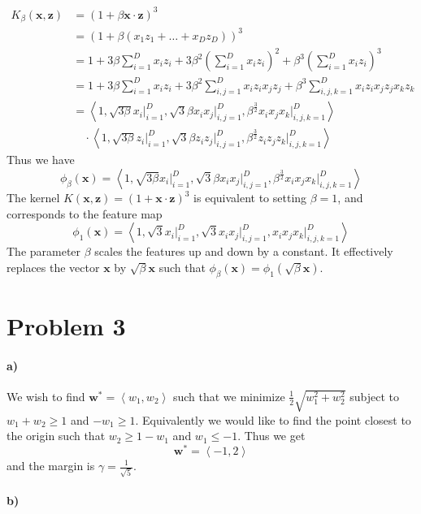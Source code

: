 \documentclass[12pt]{article}
\begin{document}
\begin{align*}
        K_\beta(\mathbf{x},\mathbf{z})&=(1+\beta\mathbf{x}\cdot\mathbf{z})^3\\
        &=(1+\beta(x_1z_1+\ldots+x_Dz_D))^3\\
        &=1+3\beta\sum_{i=1}^Dx_iz_i+3\beta^2\left(\sum_{i=1}^Dx_iz_i\right)^2+\beta^3\left(\sum_{i=1}^Dx_iz_i\right)^3\\
        &=1+3\beta\sum_{i=1}^Dx_iz_i+3\beta^2\sum_{i,j=1}^Dx_iz_ix_jz_j+\beta^3\sum_{i,j,k=1}^Dx_iz_ix_jz_jx_kz_k\\
        &=\left<1,\sqrt{3\beta}x_i\Big|_{i=1}^D,\sqrt{3}\beta x_ix_j\Big|_{i,j=1}^D,\beta^\frac{3}{2} x_ix_jx_k\Big|_{i,j,k=1}^D\right>\\
        &\quad\cdot\left<1,\sqrt{3\beta}z_i\Big|_{i=1}^D,\sqrt{3}\beta z_iz_j\Big|_{i,j=1}^D,\beta^\frac{3}{2} z_iz_jz_k\Big|_{i,j,k=1}^D\right>
\end{align*}
Thus we have
\[\phi_\beta(\mathbf{x})=\left<1,\sqrt{3\beta}x_i\Big|_{i=1}^D,\sqrt{3}\beta x_ix_j\Big|_{i,j=1}^D,\beta^\frac{3}{2} x_ix_jx_k\Big|_{i,j,k=1}^D\right>\]
The kernel \(K(\mathbf{x},\mathbf{z})=(1+\mathbf{x}\cdot\mathbf{z})^3\) is equivalent to setting \(\beta=1\), and corresponds to the feature map
\[\phi_1(\mathbf{x})=\left<1,\sqrt{3}x_i\Big|_{i=1}^D,\sqrt{3} x_ix_j\Big|_{i,j=1}^D,x_ix_jx_k\Big|_{i,j,k=1}^D\right>\]
The parameter \(\beta\) scales the features up and down by a constant. It effectively replaces the vector \(\mathbf{x}\) by \(\sqrt{\beta}\mathbf{x}\)
such that \(\phi_\beta(\mathbf{x})=\phi_1(\sqrt{\beta}\mathbf{x})\).

\section*{Problem 3}

\paragraph{a)}

We wish to find \(\mathbf{w}^*=\left<w_1,w_2\right>\) such that we minimize \(\frac{1}{2}\sqrt{w_1^2+w_2^2}\) subject to \(w_1+w_2\geq 1\) and \(-w_1\geq 1\).
Equivalently we would like to find the point closest to the origin such that \(w_2\geq 1-w_1\) and \(w_1\leq -1\). Thus we get
\[\mathbf{w}^*=\left<-1,2\right>\]
and the margin is \(\gamma=\frac{1}{\sqrt{5}}\).

\paragraph{b)}
\end{document}
